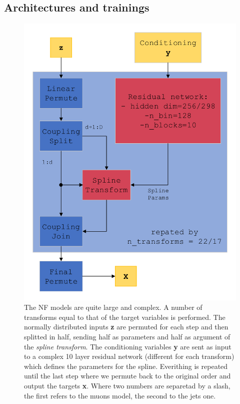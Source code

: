 \subsection{Architectures and trainings}

\begin{figure}
    \centering
    \includegraphics[width=\columnwidth]{gfx/ch5/nfmodel.pdf}
    \caption[Actual NF model]{The NF models are quite large and complex. A number of transforms equal to that of the target variables is performed. The normally distributed inputs \textbf{z} are permuted for each step and then splitted in half, sending half as parameters and half as argument of the \emph{spline transform}. The conditioning variables \textbf{y} are sent as input to a complex 10 layer residual network (different for each transform) which defines the parameters for the spline. Everithing is repeated until the last step where we permute back to the original order and output the targets \textbf{x}. Where two numbers are separetad by a slash, the first refers to the muons model, the second to the jets one.}
    \label{fig:nfmodel}
\end{figure}

